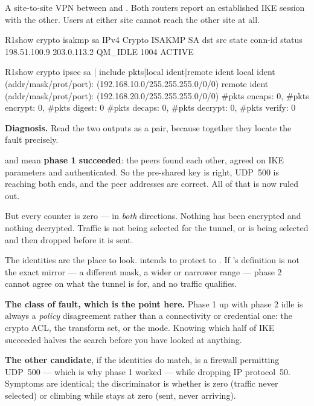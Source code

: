 \begin{breakfix}
A site-to-site VPN between  and . Both routers report an
established IKE session with the other. Users at either site cannot reach the
other site at all.

\begin{verify}{R1}{show crypto isakmp sa}
IPv4 Crypto ISAKMP SA
dst             src             state          conn-id status
198.51.100.9    203.0.113.2     QM_IDLE           1004 ACTIVE
\end{verify}

\begin{verify}{R1}{show crypto ipsec sa | include pkts|local ident|remote ident}
   local  ident (addr/mask/prot/port): (192.168.10.0/255.255.255.0/0/0)
   remote ident (addr/mask/prot/port): (192.168.20.0/255.255.255.0/0/0)
    #pkts encaps: 0, #pkts encrypt: 0, #pkts digest: 0
    #pkts decaps: 0, #pkts decrypt: 0, #pkts verify: 0
\end{verify}

\textbf{Diagnosis.} Read the two outputs as a pair, because together they locate
the fault precisely.

 and  mean \textbf{phase 1 succeeded}: the peers found
each other, agreed on IKE parameters and authenticated. So the pre-shared key is
right, UDP~500 is reaching both ends, and the peer addresses are correct. All of
that is now ruled out.

But every counter is zero --- in \emph{both} directions. Nothing has been
encrypted and nothing decrypted. Traffic is not being selected for the tunnel, or
is being selected and then dropped before it is sent.

The identities are the place to look.  intends to protect
 to . If 's definition is not
the exact mirror --- a different mask, a wider or narrower range --- phase 2
cannot agree on what the tunnel is for, and no traffic qualifies.

\textbf{The class of fault, which is the point here.} Phase 1 up with phase 2
idle is always a \emph{policy} disagreement rather than a connectivity or
credential one: the crypto ACL, the transform set, or the mode. Knowing which
half of IKE succeeded halves the search before you have looked at anything.

\textbf{The other candidate}, if the identities do match, is a firewall permitting
UDP~500 --- which is why phase 1 worked --- while dropping IP protocol~50.
Symptoms are identical; the discriminator is whether  is zero
(traffic never selected) or climbing while  stays at zero
(sent, never arriving).
\end{breakfix}

